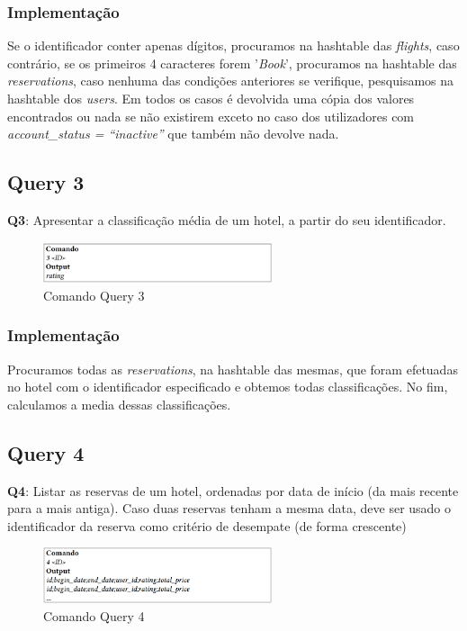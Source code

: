 \documentclass[11pt]{article}
\begin{document}
\subsubsection{Implementação}
Se o identificador conter apenas dígitos, procuramos na hashtable das \textit{flights}, caso contrário, se os primeiros 4 caracteres forem '\textit{Book}', procuramos na hashtable das \textit{reservations}, caso nenhuma das condições anteriores se verifique, pesquisamos na hashtable dos \textit{users}.
Em todos os casos é devolvida uma cópia dos valores encontrados ou nada se não existirem exceto no caso dos utilizadores com \textit{account_status = “inactive”} que também não devolve nada.

\newpage
\subsection{Query 3}
\textbf{Q3}: Apresentar a classificação média de um hotel, a partir do seu identificador.

\begin{figure}[hbt!]
    \centering
    \includegraphics[width=0.6\textwidth]{comandq3.png}
    \caption{Comando Query 3}
    \label{fig:example}
\end{figure}

\subsubsection{Implementação}
Procuramos todas as \textit{reservations}, na hashtable das mesmas, que foram efetuadas no hotel com o identificador especificado e obtemos todas classificações. No fim, calculamos a media dessas classificações.

\subsection{Query 4}
\textbf{Q4}: Listar as reservas de um hotel, ordenadas por data de início (da mais recente para a mais
antiga). Caso duas reservas tenham a mesma data, deve ser usado o identificador da reserva como critério de desempate (de forma crescente)

\begin{figure}[hbt!]
    \centering
    \includegraphics[width=0.6\textwidth]{comandq4.png}
    \caption{Comando Query 4}
    \label{fig:example}
\end{figure}
\end{document}
